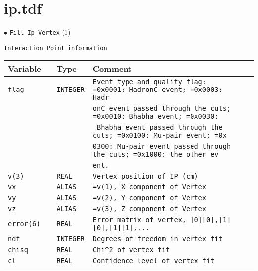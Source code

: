 \section{ip.tdf}

\noindent
\begin{minipage}{\linewidth}
{\LARGE $\bullet$ \verb+Fill_Ip_Vertex+} (1)
\label{Fill_Ip_Vertex}
\begin{verbatim}
Interaction Point information
\end{verbatim}
\begin{tabular}{|l|l|l|l|}\hline
Variable & Type & Comment\\ \hline\hline
\verb+flag        + & \verb+INTEGER+ & \verb"Event type and quality flag: =0x0001: HadronC event; =0x0003: Hadr"\\
 & & \verb"onC event passed through the cuts; =0x0010: Bhabha event; =0x0030:"\\
 & & \verb" Bhabha event passed through the cuts; =0x0100: Mu-pair event; =0x"\\
 & & \verb"0300: Mu-pair event passed through the cuts; =0x1000: the other ev"\\
 & & \verb"ent."\\
\verb+v(3)        + & \verb+REAL   + & \verb"Vertex position of IP (cm)                                         "\\
\verb+vx          + & \verb+ALIAS  + & \verb"=v(1), X component of Vertex                                       "\\
\verb+vy          + & \verb+ALIAS  + & \verb"=v(2), Y component of Vertex                                       "\\
\verb+vz          + & \verb+ALIAS  + & \verb"=v(3), Z component of Vertex                                       "\\
\verb+error(6)    + & \verb+REAL   + & \verb"Error matrix of vertex, [0][0],[1][0],[1][1],...                   "\\
\verb+ndf         + & \verb+INTEGER+ & \verb"Degrees of freedom in vertex fit                                   "\\
\verb+chisq       + & \verb+REAL   + & \verb"Chi^2 of vertex fit                                                "\\
\verb+cl          + & \verb+REAL   + & \verb"Confidence level of vertex fit                                     "\\
\hline
\end{tabular}
\end{minipage}
\vskip 8mm
